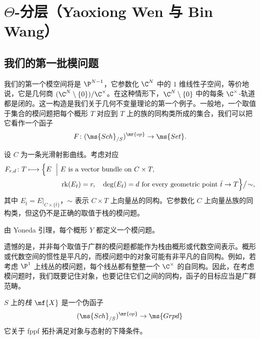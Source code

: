 \section{\(\Theta\)-分层（Yaoxiong Wen 与 Bin Wang）}%
\label{sec:Theta-stratifications}

\subsection{我们的第一批模问题}%
\label{sub:Our first moduli problem}

我们的第一个模空间将是 \(\P^{N-1}\)，它参数化 \(\C^N\) 中的 \(1\) 维线性子空间，等价地说，它是几何商 \((\C^N \setminus \{0\}) / \C^{\times}\)。在这种情形下，\(\C^N\setminus\{0\}\) 中的每条 \(\C^{\times}\)-轨道都是闭的。这一构造是我们关于几何不变量理论的第一个例子。一般地，一个取值于集合的模问题把每个概形 \(T\) 对应到 \(T\) 上的族的同构类所成的集合，我们可以把它看作一个函子
\[ F \colon (\ms{Sch}_{/S})^{\mr{op}} \to \ms{Set}. \]

\begin{exm}
    设 \(C\) 为一条光滑射影曲线。考虑对应
    \[
    \begin{aligned}
        F_{r,d}\colon T \longmapsto
        \Bigl\{
        E \ \Bigm|\ &
        E \text{ is a vector bundle on } C\times T,\\
        &\operatorname{rk}(E_{\bar t})=r,\quad \deg(E_{\bar t})=d
        \text{ for every geometric point } \bar t\to T
        \Bigr\}\big/\!\sim,
    \end{aligned}
    \]
    其中 \(E_{\bar t}=E|_{C\times\{\bar t\}}\)，\(\sim\) 表示 \(C\times T\) 上向量丛的同构。它参数化 \(C\) 上向量丛族的同构类，但这仍不是正确的取值于栈的模问题。
\end{exm}

\begin{exm}
    由 Yoneda 引理，每个概形 \(Y\) 都定义一个模问题。
\end{exm}

遗憾的是，并非每个取值于广群的模问题都能作为栈由概形或代数空间表示。概形或代数空间的惯性是平凡的，而模问题中的对象可能有非平凡的自同构。例如，若考虑 \(\P^1\) 上线丛的模问题，每个线丛都有整整一个 \(\C^{\times}\) 的自同构。因此，在考虑模问题时，我们既要记住对象，也要记住它们之间的同构，函子的目标应当是广群范畴。

\begin{defn}[非正式]
    \(S\) 上的\textit{栈} \(\mf{X}\) 是一个伪函子
    \[ (\ms{Sch}_{/S})^{\mr{op}} \to \ms{Grpd} \]
    它关于 fppf 拓扑满足对象与态射的下降条件。
\end{defn}

